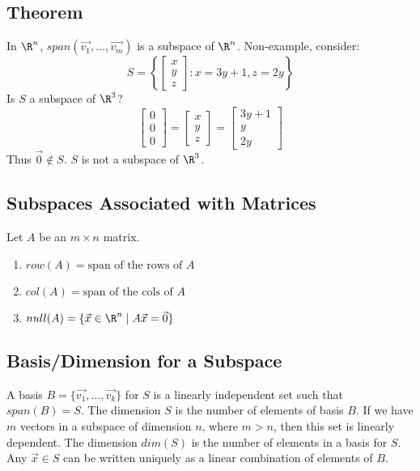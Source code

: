 \documentclass{math}
\begin{document}
\subsection*{Theorem}
In \( \R^n \), \( span(\vec{v_1},\dots,\vec{v_m}) \) is a subspace of
\( \R^n \). Non-example, consider:
\[ S = \left\{\begin{bmatrix}x \\ y \\ z\end{bmatrix}: x = 3y+1, z = 2y
  \right\} \]
Is \( S \) a subspace of \( \R^3 \)?
\[ \begin{bmatrix}0 \\ 0 \\ 0\end{bmatrix} =
  \begin{bmatrix}x \\ y \\ z\end{bmatrix} =
  \begin{bmatrix}3y+1 \\ y \\ 2y\end{bmatrix} \]
Thus \( \vec{0}\notin S \). \( S \) is not a subspace of \( \R^3 \).

\subsection*{Subspaces Associated with Matrices}
Let \( A \) be an \( m\times n \) matrix.
\begin{enumerate}
  \item \( row(A) = \text{span of the rows of } A \)
  \item \( col(A) = \text{span of the cols of } A \)
  \item \( null(A) = \{\vec{x}\in\R^n\mid A\vec{x} = \vec{0}\} \)
\end{enumerate}

\subsection*{Basis/Dimension for a Subspace}
A basis \( B = \{\vec{v_1},\dots,\vec{v_k}\} \) for \( S \) is a linearly
independent set such that \( span(B) = S \). The dimension \( S \) is the
number of elements of basis \( B \). If we have \( m \) vectors in a subspace
of dimension \( n \), where \( m > n \), then this set is linearly dependent.
The dimension \( dim(S) \) is the number of elements in a basis for \( S \).
Any \( \vec{x}\in S \) can be written uniquely as a linear combination of
elements of \( B \).
\end{document}
